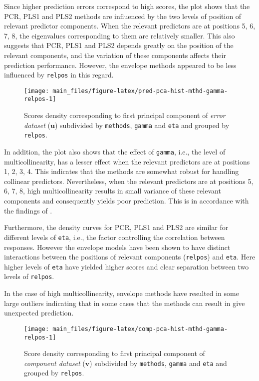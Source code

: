\documentclass[review]{elsarticle}
\begin{document}
Since higher prediction errors correspond to high scores, the plot shows
that the PCR, PLS1 and PLS2 methods are influenced by the two levels of
position of relevant predictor components. When the relevant predictors
are at positions 5, 6, 7, 8, the eigenvalues corresponding to them are
relatively smaller. This also suggests that PCR, PLS1 and PLS2 depends
greatly on the position of the relevant components, and the variation of
these components affects their prediction performance. However, the
envelope methods appeared to be less influenced by \texttt{relpos} in
this regard.






\begin{figure}[!htb]
\texttt{[image: main\_files/figure-latex/pred-pca-hist-mthd-gamma-relpos-1]} \caption{Scores density corresponding to first principal
component of \emph{error dataset} (\(\mathbf{u}\)) subdivided by
\texttt{methods}, \texttt{gamma} and \texttt{eta} and grouped by
\texttt{relpos}.}\label{fig:pred-pca-hist-mthd-gamma-relpos}
\end{figure}

In addition, the plot also shows that the effect of \texttt{gamma},
i.e., the level of multicollinearity, has a lesser effect when the
relevant predictors are at positions 1, 2, 3, 4. This indicates that the
methods are somewhat robust for handling collinear predictors.
Nevertheless, when the relevant predictors are at positions 5, 6, 7, 8,
high multicollinearity results in small variance of these relevant
components and consequently yields poor prediction. This is in
accordance with the findings of \citet{Helland1994b}.

Furthermore, the density curves for PCR, PLS1 and PLS2 are similar for
different levels of \texttt{eta}, i.e., the factor controlling the
correlation between responses. However the envelope models have been
shown to have distinct interactions between the positions of relevant
components (\texttt{relpos}) and \texttt{eta}. Here higher levels of
\texttt{eta} have yielded higher scores and clear separation between two
levels of \texttt{relpos}.

In the case of high multicollinearity, envelope methods have resulted in
some large outliers indicating that in some cases that the methods can
result in give unexpected prediction.






\begin{figure}[!htb]
\texttt{[image: main\_files/figure-latex/comp-pca-hist-mthd-gamma-relpos-1]} \caption{Score density corresponding to first principal component
of \emph{component dataset} (\(\mathbf{v}\)) subdivided by
\texttt{methods}, \texttt{gamma} and \texttt{eta} and grouped by
\texttt{relpos}.}\label{fig:comp-pca-hist-mthd-gamma-relpos}
\end{figure}
\end{document}
